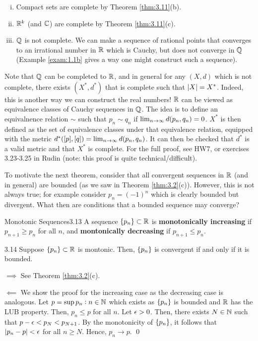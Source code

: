 \begin{nexample}{}{}
    \begin{enumerate}[(i)]
        \item Compact sets are complete by Theorem \ref{thm:3.11}(b).
        \item $\mathbb{R}^k$ (and $\mathbb{C}$) are complete by Theorem \ref{thm:3.11}(c).
        \item $\mathbb{Q}$ is not complete. We can make a sequence of rational points that converges to an irrational number in $\mathbb{R}$ which is Cauchy, but does not converge in $\mathbb{Q}$ (Example \ref{exam:1.1b} gives a way one might construct such a sequence). 
    \end{enumerate}
\end{nexample}
\noindent Note that $\mathbb{Q}$ can be completed to $\mathbb{R}$, and in general for any $(X, d)$ which is not complete, there exists $(X^*, d^*)$ that is complete such that $\abs{X} = X^*$. Indeed, this is another way we can construct the real numbers! $\mathbb{R}$ can be viewed as equivalence classes of Cauchy sequences in $\mathbb{Q}$. The idea is to define an equivalnence relation $\sim$ such that $p_n \sim q_n$ if $\lim_{n \rightarrow \infty} d(p_n, q_n) = 0$. $X^*$ is then defined as the set of equivalence classes under that equivalence relation, equipped with the metric $d^*([p], [q]) = \lim_{n \rightarrow \infty} d(p_n, q_n)$. It can then be checked that $d^*$ is a valid metric and that $X^*$ is complete. For the full proof, see HW7, or exercises 3.23-3.25 in Rudin (note: this proof is quite technical/difficult).

To motivate the next theorem, consider that all convergent sequences in $\mathbb{R}$ (and in general) are bounded (as we saw in Theorem \ref{thm:3.2}(c)). However, this is not always true; for example consider $p_n = (-1)^n$ which is clearly bounded but divergent. What then are conditions that a bounded sequence may converge?

\begin{definition}{Monotonic Sequences}{3.13}
    A sequence $\set{p_n} \subset \mathbb{R}$ is \textbf{monotonically increasing} if $p_{n+1} \geq p_n$ for all $n$, and \textbf{montonically decreasing} if $p_{n+1} \leq p_n$.
\end{definition}

\begin{theorem}{}{3.14}
    Suppose $\set{p_n} \subset \mathbb{R}$ is montonic. Then, $\set{p_n}$ is convergent if and only if it is bounded. 
\end{theorem}

\begin{nproof}
    $\boxed{\implies}$ See Theorem \ref{thm:3.2}(c).

    $\boxed{\impliedby}$ We show the proof for the increasing case as the decreasing case is analogous. Let $p = \sup{p_n: n \in \mathbb{N}}$ which exists as $\set{p_n}$ is bounded and $\mathbb{R}$ has the LUB property. Then, $p_n \leq p$ for all $n$. Let $\epsilon > 0$. Then, there exists $N \in \mathbb{N}$ such that $p - \epsilon < p_{N} < p_{N+1}$. By the monotonicity of $\set{p_n}$, it follows that $\abs{p_n - p} < \epsilon$ for all $n \geq N$. Hence, $p_n \rightarrow p$. \qed
\end{nproof}

